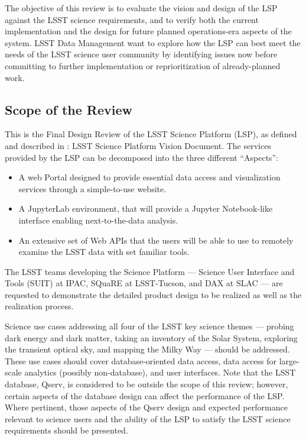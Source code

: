 \documentclass[DM,lsstdraft,STS,toc]{lsstdoc}
\begin{document}
The objective of this review is to evaluate the vision and design of the LSP against the LSST science requirements, and to verify both the current implementation
and the design for future planned operations-era aspects of the system.  LSST Data Management want to explore how the LSP can best meet the needs of the LSST science user community by
identifying issues now before committing to further implementation or reprioritization of already-planned work.


\subsection{Scope of the Review}
\label{sec:scope}
This is the Final Design Review of the LSST Science Platform (LSP), as defined and described in : LSST Science Platform Vision Document.
The services provided by the LSP can be decomposed into the three different ``Aspects'':
\begin{itemize}
\item A web Portal designed to provide essential data access and visualization services through a simple-to-use website.
\item A JupyterLab environment, that will provide a Jupyter Notebook-like interface enabling next-to-the-data analysis.
\item An extensive set of Web APIs that the users will be able to use to remotely examine the LSST data with set familiar tools.
\end{itemize}

The LSST teams developing the Science Platform --- Science User Interface and Tools (SUIT) at IPAC, SQuaRE at LSST-Tucson, and DAX at SLAC --- are
requested to demonstrate the detailed product design to be realized as well as the realization process.

Science use cases addressing all four of the LSST key science themes --- probing dark energy and dark matter,
taking an inventory of the Solar System, exploring the transient optical sky, and mapping the Milky Way --- should be addressed.
These use cases should cover database-oriented data access, data access for large-scale analytics (possibly non-database), and user interfaces. Note that the LSST database, Qserv, is considered to be outside the scope of this review; however, certain aspects of the database design can affect the performance of the LSP. Where pertinent, those aspects of the Qserv design and expected performance relevant to science users and the ability of the LSP to satisfy the LSST science requirements should be presented.
\end{document}
